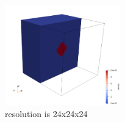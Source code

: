 \begin{center}
\includegraphics[width=5cm]{python_codes/fieldstone_10/dens}\\
{\small resolution is 24x24x24}
\end{center}

